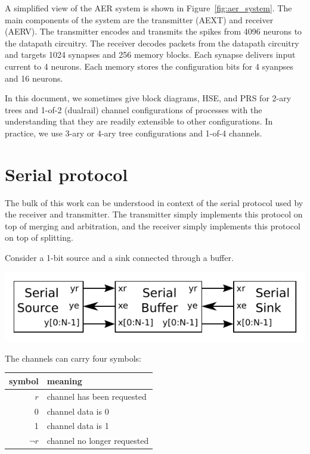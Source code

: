 \documentclass{article}
\begin{document}
A simplified view of the AER system is shown in Figure~\ref{fig:aer_system}.
The main components of the system are the transmitter (AEXT) and receiver (AERV).
The transmitter encodes and transmits the spikes from 4096 neurons to the
datapath circuitry. The receiver decodes packets from the datapath circuitry
and targets 1024 synapses and 256 memory blocks. Each synapse delivers input
current to 4 neurons. Each memory stores the configuration bits for 4 syanpses
and 16 neurons.

In this document, we sometimes give block diagrams, HSE, and PRS for 2-ary
trees and 1-of-2 (dualrail) channel configurations of processes with the
understanding that they are readily extensible to other configurations.
In practice, we use 3-ary or 4-ary tree configurations and 1-of-4 channels.

\section{Serial protocol}

The bulk of this work can be understood in context of the serial protocol
used by the receiver and transmitter.
The transmitter simply implements this protocol on top of merging and arbitration,
and the receiver simply implements this protocol on top of splitting.

Consider a 1-bit source and a sink connected through a buffer.

\begin{center}
    \includegraphics[width=.5\textwidth]{img/serial_protocol_block_diagram.pdf}
\end{center}

\noindent
The channels can carry four symbols:

\begin{center}
    \begin{tabular}{r|l}
    \hline
    symbol & meaning \\ \hline
    $r$ & channel has been requested \\
    0 & channel data is 0 \\
    1 & channel data is 1 \\
    $\neg r$ & channel no longer requested \\
    \hline
    \end{tabular}
\end{center}
\end{document}
